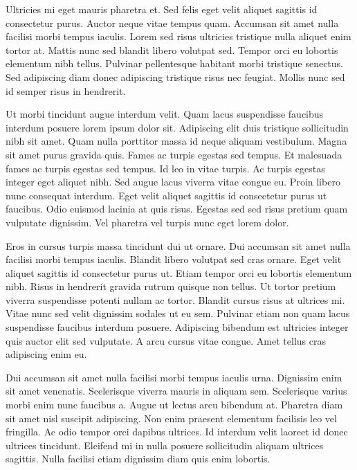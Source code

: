 Ultricies mi eget mauris pharetra et. Sed felis eget velit aliquet sagittis id consectetur purus. Auctor neque vitae tempus quam. Accumsan sit amet nulla facilisi morbi tempus iaculis. Lorem sed risus ultricies tristique nulla aliquet enim tortor at. Mattis nunc sed blandit libero volutpat sed. Tempor orci eu lobortis elementum nibh tellus. Pulvinar pellentesque habitant morbi tristique senectus. Sed adipiscing diam donec adipiscing tristique risus nec feugiat. Mollis nunc sed id semper risus in hendrerit.

Ut morbi tincidunt augue interdum velit. Quam lacus suspendisse faucibus interdum posuere lorem ipsum dolor sit. Adipiscing elit duis tristique sollicitudin nibh sit amet. Quam nulla porttitor massa id neque aliquam vestibulum. Magna sit amet purus gravida quis. Fames ac turpis egestas sed tempus. Et malesuada fames ac turpis egestas sed tempus. Id leo in vitae turpis. Ac turpis egestas integer eget aliquet nibh. Sed augue lacus viverra vitae congue eu. Proin libero nunc consequat interdum. Eget velit aliquet sagittis id consectetur purus ut faucibus. Odio euismod lacinia at quis risus. Egestas sed sed risus pretium quam vulputate dignissim. Vel pharetra vel turpis nunc eget lorem dolor.

Eros in cursus turpis massa tincidunt dui ut ornare. Dui accumsan sit amet nulla facilisi morbi tempus iaculis. Blandit libero volutpat sed cras ornare. Eget velit aliquet sagittis id consectetur purus ut. Etiam tempor orci eu lobortis elementum nibh. Risus in hendrerit gravida rutrum quisque non tellus. Ut tortor pretium viverra suspendisse potenti nullam ac tortor. Blandit cursus risus at ultrices mi. Vitae nunc sed velit dignissim sodales ut eu sem. Pulvinar etiam non quam lacus suspendisse faucibus interdum posuere. Adipiscing bibendum est ultricies integer quis auctor elit sed vulputate. A arcu cursus vitae congue. Amet tellus cras adipiscing enim eu.

Dui accumsan sit amet nulla facilisi morbi tempus iaculis urna. Dignissim enim sit amet venenatis. Scelerisque viverra mauris in aliquam sem. Scelerisque varius morbi enim nunc faucibus a. Augue ut lectus arcu bibendum at. Pharetra diam sit amet nisl suscipit adipiscing. Non enim praesent elementum facilisis leo vel fringilla. Ac odio tempor orci dapibus ultrices. Id interdum velit laoreet id donec ultrices tincidunt. Eleifend mi in nulla posuere sollicitudin aliquam ultrices sagittis. Nulla facilisi etiam dignissim diam quis enim lobortis.

